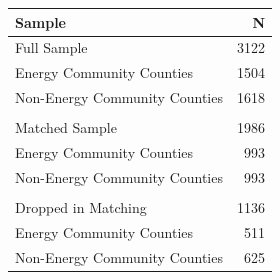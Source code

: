 \begin{tabular}{lr}
  \toprule
Sample & N \\ 
  \midrule
Full Sample & 3122 \\ 
  \quad Energy Community Counties & 1504 \\ 
  \quad Non-Energy Community Counties & 1618 \\ 
   &  \\ 
  Matched Sample & 1986 \\ 
  \quad Energy Community Counties & 993 \\ 
  \quad Non-Energy Community Counties & 993 \\ 
   &  \\ 
  Dropped in Matching & 1136 \\ 
  \quad Energy Community Counties & 511 \\ 
  \quad Non-Energy Community Counties & 625 \\ 
   \bottomrule
\end{tabular}
